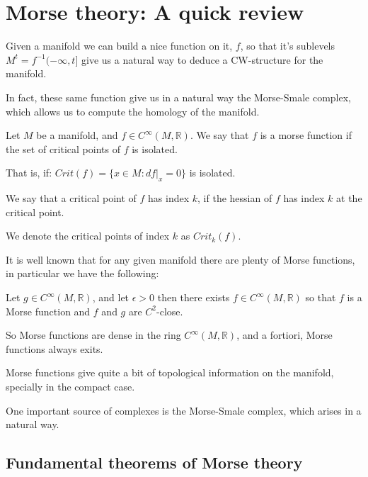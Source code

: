 \newcommand{\R}{\mathbb{R}}
\chapter{Morse theory: A quick review}



Given a manifold we can build a nice function on it, $f$,
so that it's sublevels $M^t=f^{-1}(-\infty,t]$ give us a natural way to 
deduce a CW-structure for the manifold.

In fact, these same function give us in a natural way the Morse-Smale complex,
which allows us to compute the homology of the manifold.

\begin{definition}

Let $M$ be a manifold, and $f\in C^\infty(M,\mathbb{R})$.
We say that $f$ is a morse function if the set of critical points
of $f$ is isolated. 

That is, if:
$
Crit(f)=\{x\in M: df\vert_x=0
\}
$
is isolated.

\end{definition}

We say that a critical point of $f$ has index $k$,
if the hessian of $f$ has index $k$ at the critical point.

We denote the critical points of index $k$ as $Crit_k(f)$.

It is well known that for any given manifold there are plenty of Morse functions,
in particular we have the following:


\begin{theorem}
\cite{mat1997}
Let $g\in C^\infty(M,\mathbb{R})$, and let $\epsilon>0$
then there exists $f\in C^\infty(M,\mathbb{R})$ so that $f$
is a Morse function and $f$ and $g$ are $C^2$-close.
\end{theorem}

So Morse functions are dense in the ring $C^\infty(M,\mathbb{R})$,
and a fortiori, Morse functions always exits.

Morse functions give quite a bit of topological information on the manifold,
specially in the compact case. 



One important source of complexes is the Morse-Smale complex,
which arises in a natural way.


\section{Fundamental theorems of Morse theory}

